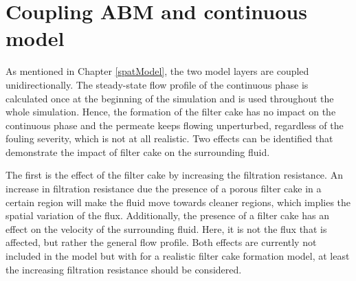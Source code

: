 \section{Coupling ABM and continuous model}
As mentioned in Chapter \ref{spatModel}, the two model layers are coupled unidirectionally. The steady-state flow profile of the continuous phase is calculated once at the beginning of the simulation and is used throughout the whole simulation. Hence, the formation of the filter cake has no impact on the continuous phase and the permeate keeps flowing unperturbed, regardless of the fouling severity, which is not at all realistic. %
Two effects can be identified that demonstrate the impact of filter cake on the surrounding fluid. \par
The first is the effect of the filter cake by increasing the filtration resistance. An increase in filtration resistance due the presence of a porous filter cake in a certain region will make the fluid move towards cleaner regions, which implies the spatial variation of the flux. %
Additionally, the presence of a filter cake has an effect on the velocity of the surrounding fluid. Here, it is not the flux that is affected, but rather the general flow profile.    %
Both effects are currently not included in the model but with for a realistic filter cake formation model, at least the increasing filtration resistance should be considered.%
